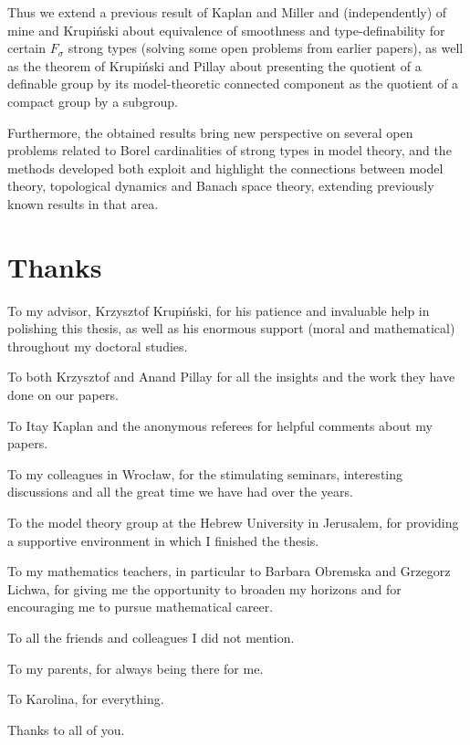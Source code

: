 \documentclass[12pt,a4paper,final]{book}
\theoremstyle{remark}
\theoremstyle{definition}
\begin{document}
	Thus we extend a previous result of Kaplan and Miller and (independently) of mine and Krupiński about equivalence of smoothness and type-definability for certain $F_\sigma$ strong types (solving some open problems from earlier papers), as well as the theorem of Krupiński and Pillay about presenting the quotient of a definable group by its model-theoretic connected component as the quotient of a compact group by a subgroup.
	
	Furthermore, the obtained results bring new perspective on several open problems related to Borel cardinalities of strong types in model theory, and the methods developed both exploit and highlight the connections between model theory, topological dynamics and Banach space theory, extending previously known results in that area.
	
	\newpage
	\thispagestyle{empty}
	\section*{Thanks}
	{\setlength{\parskip}{1em}\setlength{\parindent}{0em}
		To my advisor, Krzysztof Krupiński, for his patience and invaluable help in polishing this thesis, as well as his enormous support (moral and mathematical) throughout my doctoral studies.
		
		To both Krzysztof and Anand Pillay for all the insights and the work they have done on our papers.
		
		To Itay Kaplan and the anonymous referees for helpful comments about my papers.
		
		To my colleagues in Wrocław, for the stimulating seminars, interesting discussions and all the great time we have had over the years.
		
		To the model theory group at the Hebrew University in Jerusalem, for providing a supportive environment in which I finished the thesis.
		
		To my mathematics teachers, in particular to Barbara Obremska and Grzegorz Lichwa, for giving me the opportunity to broaden my horizons and for encouraging me to pursue mathematical career.
		
		To all the friends and colleagues I did not mention.
		
		To my parents, for always being there for me.
		
		To Karolina, for everything.
		
		Thanks to all of you.
	}
	
	
	
	\tableofcontents
	
\end{document}

